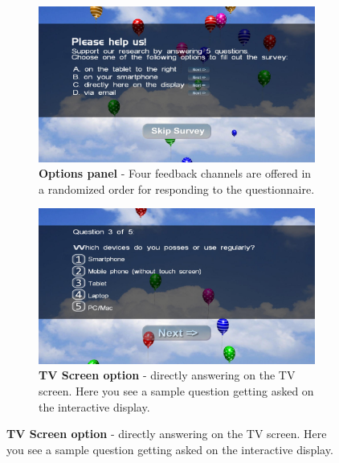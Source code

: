    \begin{figure}[hb]
        \centering
        \begin{subfigure}{0.7\textwidth}
            \centering
        \includegraphics[width=\columnwidth]{img/screenshots/balloon-game/options-overview.jpg}
            \caption{\textbf{Options panel} - Four feedback channels are offered in a randomized order for responding to the questionnaire. \\}
            \label{screenshot:options}
        \end{subfigure}
        \hfill
        \begin{subfigure}{0.7\textwidth}
            \centering
    \includegraphics[width=\columnwidth]{img/screenshots/balloon-game/option-tv.jpg}
            \caption{\textbf{TV Screen option} - directly answering on the TV screen. Here you see a sample question getting asked on the interactive display. \\}
            \label{screenshot:tv-option}
        \end{subfigure}
    \end{figure}





